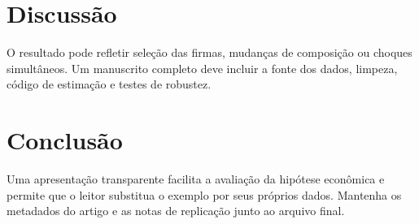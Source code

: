 \documentclass[11pt,a4paper]{article}
\begin{document}
\section{Discussão}
O resultado pode refletir seleção das firmas, mudanças de composição ou
choques simultâneos. Um manuscrito completo deve incluir a fonte dos dados,
limpeza, código de estimação e testes de robustez.

\section{Conclusão}
Uma apresentação transparente facilita a avaliação da hipótese econômica e
permite que o leitor substitua o exemplo por seus próprios dados. Mantenha os
metadados do artigo e as notas de replicação junto ao arquivo final.
\end{document}
